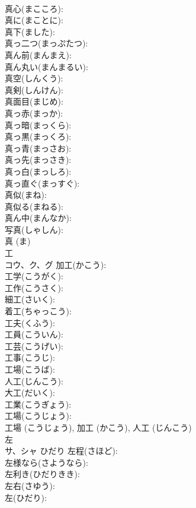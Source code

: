 \documentclass[8pt]{extreport}
\begin{document}
\begin{CJK}{UTF8}{min}
\\	真心(まこころ): 
\\	真に(まことに): 
\\	真下(ました): 
\\	真っ二つ(まっぷたつ): 
\\	真ん前(まんまえ): 
\\	真ん丸い(まんまるい): 
\\	真空(しんくう): 
\\	真剣(しんけん): 
\\	真面目(まじめ): 
\\	真っ赤(まっか): 
\\	真っ暗(まっくら): 
\\	真っ黒(まっくろ): 
\\	真っ青(まっさお): 
\\	真っ先(まっさき): 
\\	真っ白(まっしろ): 
\\	真っ直ぐ(まっすぐ): 
\\	真似(まね): 
\\	真似る(まねる): 
\\	真ん中(まんなか): 
\\	写真(しゃしん): 
\\	真 (ま)
\\	工			
\\	コウ、ク、グ		加工(かこう): 
\\	工学(こうがく): 
\\	工作(こうさく): 
\\	細工(さいく): 
\\	着工(ちゃっこう): 
\\	工夫(くふう): 
\\	工員(こういん): 
\\	工芸(こうげい): 
\\	工事(こうじ): 
\\	工場(こうば): 
\\	人工(じんこう): 
\\	大工(だいく): 
\\	工業(こうぎょう): 
\\	工場(こうじょう): 
\\	工場 (こうじょう), 加工 (かこう), 人工 (じんこう)
\\	左			
\\	サ、シャ	ひだり	左程(さほど): 
\\	左様なら(さようなら): 
\\	左利き(ひだりきき): 
\\	左右(さゆう): 
\\	左(ひだり): 

\end{CJK}
\end{document}
